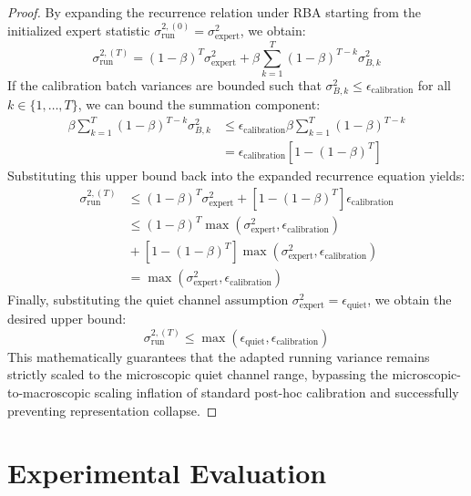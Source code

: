 \documentclass{article}
\begin{document}
\begin{proof}
By expanding the recurrence relation under RBA starting from the initialized expert statistic $\sigma^{2,(0)}_{\text{run}} = \sigma^2_{\text{expert}}$, we obtain:
\begin{equation}
  \sigma^{2,(T)}_{\text{run}} = (1 - \beta)^T \sigma^2_{\text{expert}} + \beta \sum_{k=1}^T (1 - \beta)^{T-k} \sigma^2_{B,k}
\end{equation}
If the calibration batch variances are bounded such that $\sigma^2_{B,k} \leq \epsilon_{\text{calibration}}$ for all $k \in \{1, \dots, T\}$, we can bound the summation component:
\begin{align}
  \beta \sum_{k=1}^T (1 - \beta)^{T-k} \sigma^2_{B,k} &\leq \epsilon_{\text{calibration}} \beta \sum_{k=1}^T (1 - \beta)^{T-k} \nonumber \\
  &= \epsilon_{\text{calibration}} \left[ 1 - (1 - \beta)^T \right]
\end{align}
Substituting this upper bound back into the expanded recurrence equation yields:
\begin{align}
  \sigma^{2,(T)}_{\text{run}} &\leq (1 - \beta)^T \sigma^2_{\text{expert}} + \left[ 1 - (1 - \beta)^T \right] \epsilon_{\text{calibration}} \nonumber \\
  &\leq (1 - \beta)^T \max(\sigma^2_{\text{expert}}, \epsilon_{\text{calibration}}) \nonumber \\
  &{} + \left[ 1 - (1 - \beta)^T \right] \max(\sigma^2_{\text{expert}}, \epsilon_{\text{calibration}}) \nonumber \\
  &= \max(\sigma^2_{\text{expert}}, \epsilon_{\text{calibration}})
\end{align}
Finally, substituting the quiet channel assumption $\sigma^2_{\text{expert}} = \epsilon_{\text{quiet}}$, we obtain the desired upper bound:
\begin{equation}
  \sigma^{2,(T)}_{\text{run}} \leq \max(\epsilon_{\text{quiet}}, \epsilon_{\text{calibration}})
\end{equation}
This mathematically guarantees that the adapted running variance remains strictly scaled to the microscopic quiet channel range, bypassing the microscopic-to-macroscopic scaling inflation of standard post-hoc calibration and successfully preventing representation collapse.
\end{proof}

\section{Experimental Evaluation}
\label{sec:eval}
\end{document}
